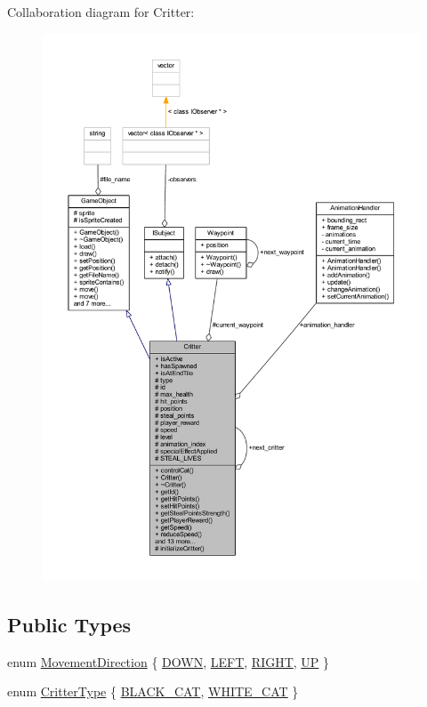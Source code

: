 Collaboration diagram for Critter\+:
\nopagebreak
\begin{figure}[H]
\begin{center}
\leavevmode
\includegraphics[width=350pt]{class_critter__coll__graph}
\end{center}
\end{figure}
\subsection*{Public Types}
\begin{DoxyCompactItemize}
\item 
enum \hyperlink{class_critter_a42f4af08084e39edfdb55e38a5858cc4}{Movement\+Direction} \{ \hyperlink{class_critter_a42f4af08084e39edfdb55e38a5858cc4a194b84d714feed4d94178aacf40528df}{D\+O\+W\+N}, 
\hyperlink{class_critter_a42f4af08084e39edfdb55e38a5858cc4a8c53a6501cb2c04d7207d989683eb84a}{L\+E\+F\+T}, 
\hyperlink{class_critter_a42f4af08084e39edfdb55e38a5858cc4aea95699e0bc4235e0196fc1833ab589d}{R\+I\+G\+H\+T}, 
\hyperlink{class_critter_a42f4af08084e39edfdb55e38a5858cc4a5e79e0e8e8c8e0bc3ba2f93b2c9a34ab}{U\+P}
 \}
\item 
enum \hyperlink{class_critter_acda8a5c3234b66101e0546d75d6f90f1}{Critter\+Type} \{ \hyperlink{class_critter_acda8a5c3234b66101e0546d75d6f90f1a91135fa8da5b64a8a556e8c198b46fe9}{B\+L\+A\+C\+K\+\_\+\+C\+A\+T}, 
\hyperlink{class_critter_acda8a5c3234b66101e0546d75d6f90f1ac88c727edcec187617ee3707d2c193c5}{W\+H\+I\+T\+E\+\_\+\+C\+A\+T}
 \}
\end{DoxyCompactItemize}
